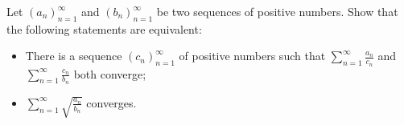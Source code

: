 Let $(a_n)_{n=1}^{\infty}$ and $(b_n)_{n=1}^{\infty}$ be two sequences of positive numbers. Show that the following statements are equivalent:
\begin{itemize}
	\item There is a sequence $(c_n)_{n=1}^{\infty}$ of positive numbers such that $\sum_{n=1}^{\infty}{\frac{a_n}{c_n}}$ and $\sum_{n=1}^{\infty}{\frac{c_n}{b_n}}$ both converge;
	\item $\sum_{n=1}^{\infty}{\sqrt{\frac{a_n}{b_n}}}$ converges.
\end{itemize}

